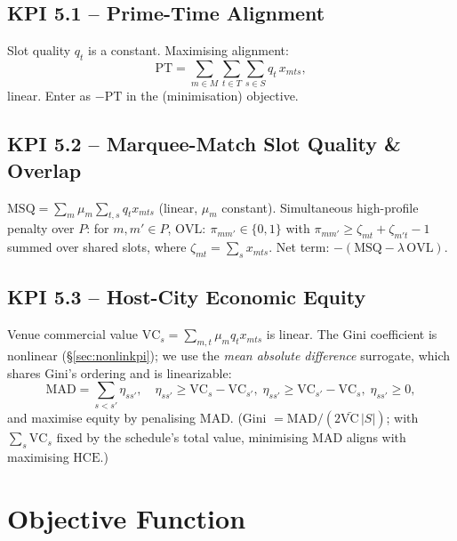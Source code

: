 \documentclass[12pt, letterpaper]{article}
\begin{document}
\subsection{KPI 5.1 -- Prime-Time Alignment}
Slot quality $q_t$ is a constant. Maximising alignment:
\begin{equation}
\mathrm{PT}=\sum_{m\in M}\sum_{t\in T}\sum_{s\in S} q_t\, x_{mts},
\end{equation}
linear. Enter as $-\mathrm{PT}$ in the (minimisation) objective.

\subsection{KPI 5.2 -- Marquee-Match Slot Quality \& Overlap}
$\mathrm{MSQ}=\sum_{m}\mu_m\sum_{t,s} q_t x_{mts}$ (linear, $\mu_m$
constant). Simultaneous high-profile penalty over $P$: for
$m,m'\in P$, $\mathrm{OVL}\!:\ \pi_{mm'}\in\{0,1\}$ with
$\pi_{mm'}\ge \zeta_{mt}+\zeta_{m't}-1$ summed over shared slots, where
$\zeta_{mt}=\sum_s x_{mts}$. Net term: $-(\mathrm{MSQ}-\lambda\,
\mathrm{OVL})$.

\subsection{KPI 5.3 -- Host-City Economic Equity}
Venue commercial value $\mathrm{VC}_s=\sum_{m,t}\mu_m q_t x_{mts}$ is
linear. The Gini coefficient is nonlinear (\S\ref{sec:nonlinkpi}); we use
the \emph{mean absolute difference} surrogate, which shares Gini's
ordering and is linearizable:
\begin{equation}
\mathrm{MAD}=\sum_{s<s'} \eta_{ss'},\quad
\eta_{ss'}\ge \mathrm{VC}_s-\mathrm{VC}_{s'},\;
\eta_{ss'}\ge \mathrm{VC}_{s'}-\mathrm{VC}_s,\;\eta_{ss'}\ge0,
\end{equation}
and maximise equity by penalising $\mathrm{MAD}$. (Gini $=
\mathrm{MAD}/(2\bar{\mathrm{VC}}\,|S|)$; with $\sum_s\mathrm{VC}_s$ fixed
by the schedule's total value, minimising MAD aligns with maximising
$\mathrm{HCE}$.)

\section{Objective Function}
\end{document}
